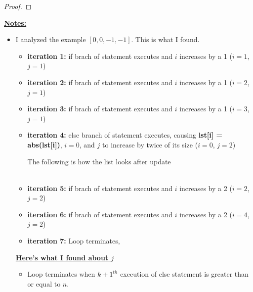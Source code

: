 \documentclass[12pt]{article}
\begin{document}
\begin{enumerate}[a.]
\begin{proof}
    \end{proof}

    \underline{\textbf{Notes:}}

    \bigskip

    \begin{itemize}
        \item

        I analyzed the example $[0,0,-1,-1]$. This is what I found.

        \bigskip

        \begin{itemize}
            \item \textbf{iteration 1:} if brach of statement executes and $i$ increases
            by a 1 ($i = 1$, $j = 1$)
            \item \textbf{iteration 2:} if brach of statement executes and $i$ increases
            by a 1 ($i = 2$, $j = 1$)
            \item \textbf{iteration 3:} if brach of statement executes and $i$ increases
            by a 1 ($i = 3$, $j = 1$)
            \item \textbf{iteration 4:} else branch of statement executes, causing
            \textbf{lst[i] = abs(lst[i])}, $i = 0$, and $j$ to increase by twice of its size ($i = 0$, $j = 2$)

            \bigskip

            The following is how the list looks after update

            \begin{align*}
                [0,0,1,-1]
            \end{align*}

            \item \textbf{iteration 5:} if brach of statement executes and $i$ increases
            by a 2 ($i = 2$, $j = 2$)
            \item \textbf{iteration 6:} if brach of statement executes and $i$ increases
            by a 2 ($i = 4$, $j = 2$)
            \item \textbf{iteration 7:} Loop terminates,
        \end{itemize}

        \bigskip

        \underline{\textbf{Here's what I found about $j$}}

        \bigskip

        \begin{itemize}
            \item Loop terminates when $k+1^{th}$ execution of else statement is greater than or equal to $n$.
        \end{itemize}


\end{itemize}
\end{enumerate}
\end{document}
